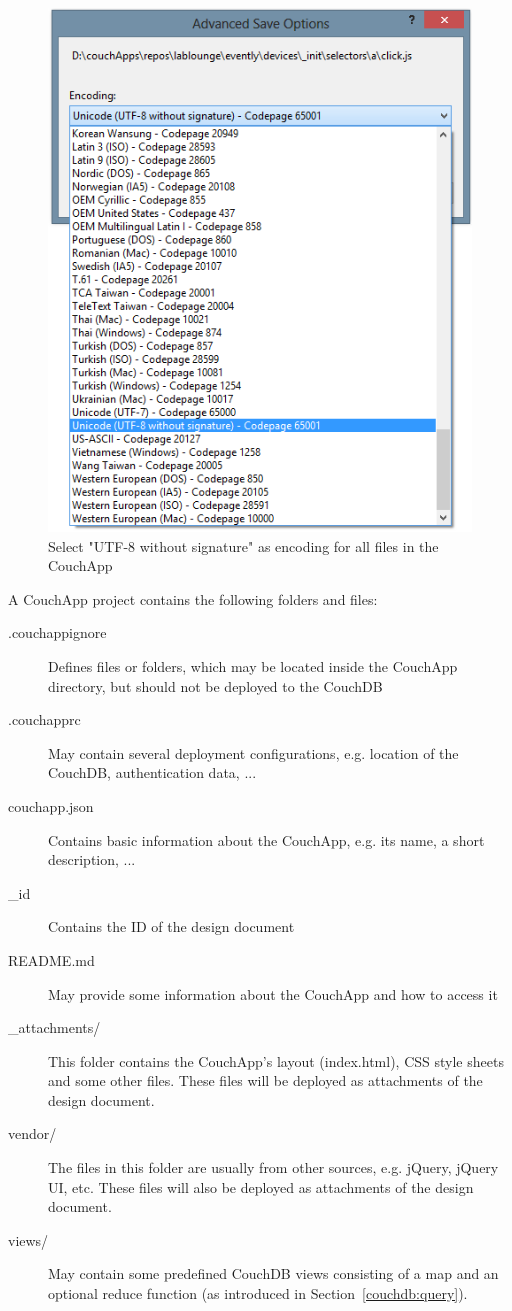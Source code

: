 \begin{figure}[t!]
\centering
\includegraphics[width=0.50\columnwidth]{images/VSfileencoding.png}
\caption{Select "UTF-8 without signature" as encoding for all files in the CouchApp}
\label{img:vsfileencoding}
\end{figure}

A CouchApp project contains the following folders and files:
\begin{description}
\item[.couchappignore] Defines files or folders, which may be located inside the CouchApp directory, but should not be deployed to the CouchDB
\item[.couchapprc] May contain several deployment configurations, e.g. location of the CouchDB, authentication data, ...
\item[couchapp.json] Contains basic information about the CouchApp, e.g. its name, a short description, ...
\item[\_id] Contains the ID of the design document
\item[README.md] May provide some information about the CouchApp and how to access it
\item[\_attachments/] This folder contains the CouchApp's layout (index.html), CSS style sheets and some other files. These files will be deployed as attachments of the design document.
\item[vendor/] The files in this folder are usually from other sources, e.g. jQuery, jQuery UI, etc. These files will also be deployed as attachments of the design document.
\item[views/] May contain some predefined CouchDB views consisting of a map and an optional reduce function (as introduced in Section~\ref{couchdb:query}).
\end{description}
